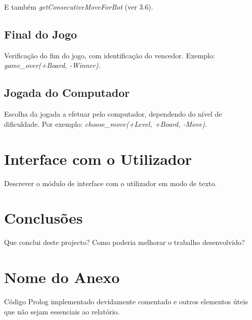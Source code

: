 \documentclass[a4paper]{article}
\begin{document}
E também \textit{getConsecutiveMoveForBot} (ver 3.6).

\subsection{Final do Jogo} Verificação do fim do jogo, com identificação do vencedor. Exemplo: \textit{game\_over(+Board, -Winner)}.

\subsection{Jogada do Computador} Escolha da jogada a efetuar pelo computador, dependendo do nível de dificuldade. Por exemplo: \textit{choose\_move(+Level, +Board, -Move)}.


\section{Interface com o Utilizador}

Descrever o módulo de interface com o utilizador em modo de texto.


\section{Conclusões}
Que conclui deste projecto? Como poderia melhorar o trabalho desenvolvido?


\clearpage
{}
\renewcommand\refname{Bibliografia}



\newpage
\appendix
\section{Nome do Anexo}
Código Prolog implementado devidamente comentado e outros elementos úteis que não sejam essenciais ao relatório.
\end{document}

